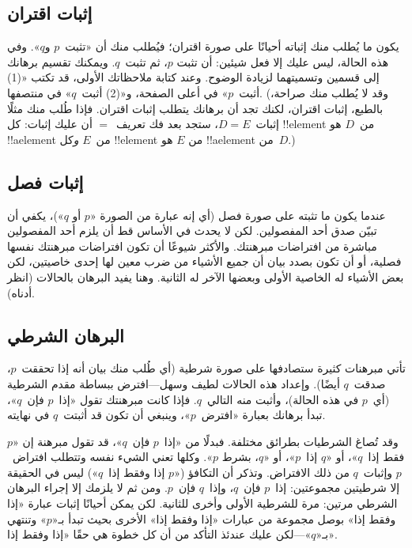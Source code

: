 \documentclass[../../../include/open-logic-section]{subfiles}
\begin{document}
\subsection{إثبات اقتران}

يكون ما يُطلب منك إثباته أحيانًا على صورة اقتران؛ فيُطلب منك أن
«تثبت~$p$ و$q$». وفي هذه الحالة، ليس عليك إلا فعل شيئين: أن تثبت
$p$، ثم تثبت~$q$. ويمكنك تقسيم برهانك إلى قسمين وتسميتهما لزيادة
الوضوح. وعند كتابة ملاحظاتك الأولى، قد تكتب «(1) أثبت~$p$» في أعلى
الصفحة، و«(2) أثبت~$q$» في منتصفها. (وقد لا يُطلب منك صراحة، بالطبع،
إثبات اقتران، لكنك تجد أن برهانك يتطلب إثبات اقتران. فإذا طُلب منك
مثلًا إثبات~$D = E$، ستجد بعد فك تعريف~$=$ أن عليك إثبات: كل
!!{element} من~$D$ هو !!a{element} من~$E$ \emph{و}كل !!{element} من
$E$ هو !!a{element} من~$D$.)

\subsection{إثبات فصل}

عندما يكون ما تثبته على صورة فصل (أي إنه عبارة من الصورة «$p$ أو
$q$»)، يكفي أن تبيّن صدق أحد المفصولين. لكن لا يحدث في الأساس قط أن
يلزم أحد المفصولين مباشرة من افتراضات مبرهنتك. والأكثر شيوعًا أن تكون
افتراضات مبرهنتك نفسها فصلية، أو أن تكون بصدد بيان أن جميع الأشياء
من ضرب معين لها إحدى خاصيتين، لكن بعض الأشياء له الخاصية الأولى
وبعضها الآخر له الثانية. وهنا يفيد البرهان بالحالات (انظر أدناه).

\subsection{البرهان الشرطي}

تأتي مبرهنات كثيرة ستصادفها على صورة شرطية (أي طُلب منك بيان أنه إذا
تحققت~$p$، صدقت~$q$ أيضًا). وإعداد هذه الحالات لطيف وسهل---افترض
ببساطة مقدم الشرطية (أي~$p$ في هذه الحالة)، وأثبت منه التالي~$q$.
فإذا كانت مبرهنتك تقول «إذا~$p$ فإن~$q$»، تبدأ برهانك بعبارة
«افترض~$p$»، وينبغي أن تكون قد أثبتت~$q$ في نهايته.

وقد تُصاغ الشرطيات بطرائق مختلفة. فبدلًا من «إذا~$p$ فإن~$q$»، قد
تقول مبرهنة إن «$p$ فقط إذا~$q$»، أو «$q$ إذا~$p$»، أو «$q$، بشرط
$p$». وكلها تعني الشيء نفسه وتتطلب افتراض~$p$ وإثبات~$q$ من ذلك
الافتراض. وتذكر أن التكافؤ («$p$ إذا وفقط إذا~$q$») ليس في الحقيقة
إلا شرطيتين مجموعتين: إذا~$p$ فإن~$q$، وإذا~$q$ فإن~$p$. ومن ثم لا
يلزمك إلا إجراء البرهان الشرطي مرتين: مرة للشرطية الأولى وأخرى
للثانية. لكن يمكن أحيانًا إثبات عبارة «إذا وفقط إذا» بوصل مجموعة من
عبارات «إذا وفقط إذا» الأخرى بحيث تبدأ بـ«$p$» وتنتهي بـ«$q$»---لكن
عليك عندئذ التأكد من أن كل خطوة هي حقًا «إذا وفقط إذا».
\end{document}

